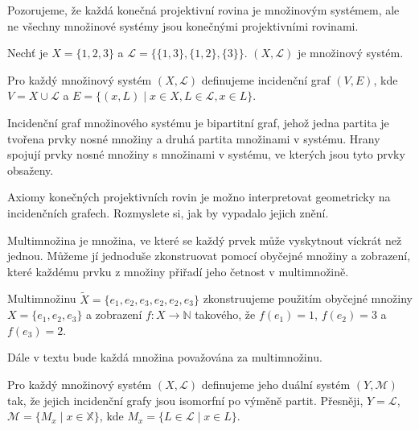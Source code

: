 \begin{t_remark}
  Pozorujeme, že každá konečná projektivní rovina je množinovým systémem, ale ne všechny množinové systémy jsou konečnými projektivními rovinami.
\end{t_remark}

\begin{t_example}
  Nechť je $X=\{1,2,3\}$ a $\mathcal{L}=\{\{1,3\},\{1,2\},\{3\}\}$. $(X,\mathcal{L})$ je množinový systém.
\end{t_example}

\begin{t_definition}
  Pro každý množinový systém $(X,\mathcal{L})$ definujeme incidenční graf $(V,E)$, kde $V=X\cup\mathcal{L}$ a $E=\{(x,L)\mid x\in X, L\in\mathcal{L}, x\in L\}$.
\end{t_definition}

\begin{t_remark}
  Incidenční graf množinového systému je bipartitní graf, jehož jedna partita je tvořena prvky nosné množiny a druhá partita množinami v systému. Hrany spojují prvky nosné množiny s množinami v systému, ve kterých jsou tyto prvky obsaženy.
\end{t_remark}

\begin{t_remark}
  Axiomy konečných projektivních rovin je možno interpretovat geometricky na incidenčních grafech. Rozmyslete si, jak by vypadalo jejich znění.
\end{t_remark}

\begin{t_definition}
  Multimnožina je množina, ve které se každý prvek může vyskytnout víckrát než jednou. Můžeme jí jednoduše zkonstruovat pomocí obyčejné množiny a zobrazení, které každému prvku z množiny přiřadí jeho četnost v multimnožině.
\end{t_definition}

\begin{t_example}
  Multimnožinu $\tilde{X}=\{e_1, e_2, e_3, e_2, e_2, e_3\}$ zkonstruujeme použitím obyčejné množiny $X=\{e_1, e_2, e_3\}$ a zobrazení $f:X\rightarrow\mathbb{N}$ takového, že $f(e_1)=1$, $f(e_2)=3$ a $f(e_3)=2$.
\end{t_example}

\begin{t_remark}
  Dále v textu bude každá množina považována za multimnožinu.
\end{t_remark}

\begin{t_definition}
  Pro každý množinový systém $(X,\mathcal{L})$ definujeme jeho duální systém $(Y,\mathcal{M})$ tak, že jejich incidenční grafy jsou isomorfní po výměně partit. Přesněji, $Y=\mathcal{L}$, $\mathcal{M}=\{M_x\mid x\in\mathbb{X}\}$, kde $M_x=\{L\in\mathcal{L}\mid x\in L\}$.
\end{t_definition}

